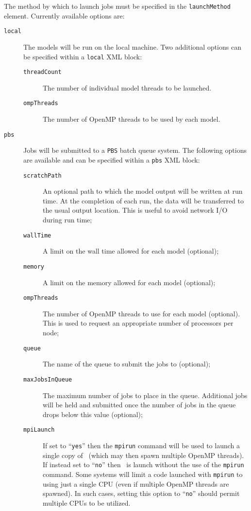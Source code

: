 The method by which to launch jobs must be specified in the {\tt launchMethod} element. Currently available options are:
\begin{description}
\item[{\tt local}] The models will be run on the local machine. Two additional options can be specified within a {\tt local} XML block:
\begin{description}
\item[{\tt threadCount}] The number of individual model threads to be launched.
\item[{\tt ompThreads}] The number of OpenMP threads to be used by each model.
\end{description}

\item[{\tt pbs}] Jobs will be submitted to a {\tt PBS} batch queue system. The following options are available and can be specified within a {\tt pbs} XML block:
\begin{description}
\item[{\tt scratchPath}] An optional path to which the model output will be written at run time. At the completion of each run, the data will be transferred to the usual output location. This is useful to avoid network I/O during run time;
\item[{\tt wallTime}] A limit on the wall time allowed for each model (optional);
\item[{\tt memory}] A limit on the memory allowed for each model (optional);
\item[{\tt ompThreads}] The number of OpenMP threads to use for each model (optional). This is used to request an appropriate number of processors per node;
\item[{\tt queue}] The name of the queue to submit the jobs to (optional);
\item[{\tt maxJobsInQueue}] The maximum number of jobs to place in the queue. Additional jobs will be held and submitted once the number of jobs in the queue drops below this value (optional);
\item[{\tt mpiLaunch}] If set to ``{\tt yes}'' then the {\tt mpirun} command will be used to launch a single copy of \glc\ (which may then spawn multiple OpenMP threads). If instead set to ``{\tt no}'' then \glc\ is launch without the use of the {\tt mpirun} command. Some systems will limit a code launched with {\tt mpirun} to using just a single CPU (even if multiple OpenMP threads are spawned). In such cases, setting this option to ``{\tt no}'' should permit multiple CPUs to be utilized.

\end{description}
\end{description}
